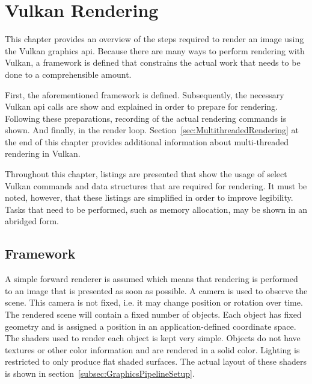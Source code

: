 
\chapter{Vulkan Rendering}
\label{cha:RenderPipeline}


  This chapter provides an overview of the steps required to render an image using the Vulkan graphics \gls{api}.
  Because there are many ways to perform rendering with Vulkan, a framework is defined that constrains the actual work that needs to be done to a comprehensible amount.

  First, the aforementioned framework is defined.
  Subsequently, the necessary Vulkan \gls{api} calls are show and explained in order to prepare for rendering.
  Following these preparations, recording of the actual rendering commands is shown.
  And finally, in the render loop.
  Section~\ref{sec:MultithreadedRendering} at the end of this chapter provides additional information about multi-threaded rendering in Vulkan.

  Throughout this chapter, listings are presented that show the usage of select Vulkan commands and data structures that are required for rendering.
  It must be noted, however, that these listings are simplified in order to improve legibility.
  Tasks that need to be performed, such as memory allocation, may be shown in an abridged form.

  \section{Framework}
  \label{sec:Framework}
    A simple forward renderer is assumed which means that rendering is performed to an image that is presented as soon as possible.
    A camera is used to observe the scene.
    This camera is not fixed, i.e. it may change position or rotation over time.
    The rendered scene will contain a fixed number of objects.
    Each object has fixed geometry and is assigned a position in an application-defined coordinate space.
    The shaders used to render each object is kept very simple.
    Objects do not have textures or other color information and are rendered in a solid color.
    Lighting is restricted to only produce flat shaded surfaces.
    The actual layout of these shaders is shown in section~\ref{subsec:GraphicsPipelineSetup}.

